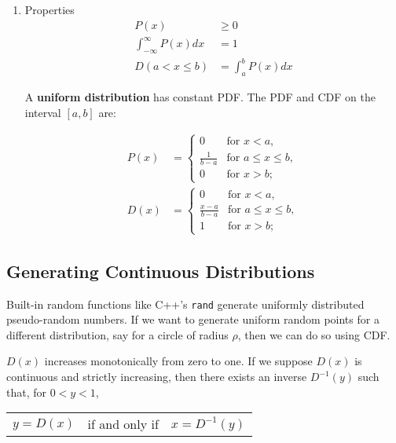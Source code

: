 \documentclass[11pt]{article}
\begin{document}
\begin{enumerate}
\item Properties
\label{sec:orga7766c0}
 \begin{align*}
     P\left( x \right) &\geq 0 \\
     \int_{-\infty}^{\infty} P\left( x \right)dx &= 1 \\
     D\left( a < x \leq b \right) &= \int_{a}^{b} P\left( x \right)dx
\end{align*}

A \textbf{uniform distribution} has constant PDF. The PDF and CDF on the interval \(\left[ a,b \right]\) are:

\begin{align*}
    P\left( x \right) &= \begin{cases}
                             0 &\text{for } x < a, \\
                             \frac{1}{b - a} &\text{for } a \leq x \leq b, \\
                             0 &\text{for } x > b;
                         \end{cases} \\
    D\left( x \right) &= \begin{cases}
                             0 &\text{for } x < a, \\
                             \frac{x - a}{b - a} &\text{for } a \leq x \leq b, \\
                             1 &\text{for } x > b;
                         \end{cases}
\end{align*}
\end{enumerate}

\subsection{Generating Continuous Distributions}
\label{sec:orgeed1fc5}
Built-in random functions like C++'s \texttt{rand} generate uniformly distributed pseudo-random numbers. If we want to generate uniform random points for a different distribution, say for a circle of radius \(\rho\), then we can do so using CDF.

\(D\left( x \right)\) increases monotonically from zero to one. If we suppose \(D\left( x \right)\) is continuous and strictly increasing, then there exists an inverse \(D^{-1}\left( y \right)\) such that, for \(0 < y < 1\),

\begin{center}
    \begin{tabular}{ c c c }
        $y = D\left( x \right)$ & if and only if & $x = D^{-1}\left( y \right)$
    \end{tabular}
\end{center}
\end{document}
